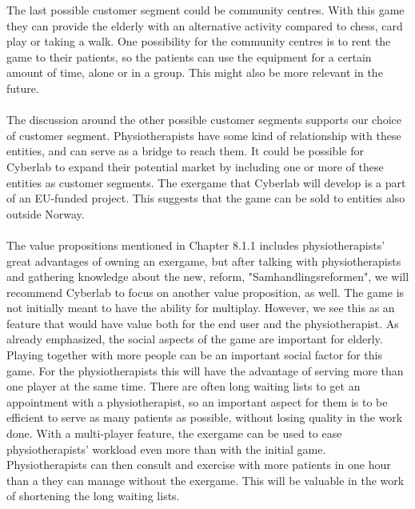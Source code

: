 The last possible customer segment could be community centres. With this game they can provide the elderly with an alternative activity compared to chess, card play or taking a walk. One possibility for the community centres is to rent the game to their patients, so the patients can use the equipment for a certain amount of time, alone or in a group. This might also be more relevant in the future. \\ \\
The discussion around the other possible customer segments supports our choice of customer segment. Physiotherapists have some kind of relationship with these entities, and can serve as a bridge to reach them. It could be possible for Cyberlab to expand their potential market by including one or more of these entities as customer segments. The exergame that Cyberlab will develop is a part of an EU-funded project. This suggests that the game can be sold to entities also outside Norway.  \\ \\
The value propositions mentioned in Chapter 8.1.1 includes physiotherapists' great advantages of owning an exergame, but after talking with physiotherapists and gathering knowledge about the new, reform, "Samhandlingsreformen", we will recommend Cyberlab to focus on another value proposition, as well. The game is not initially meant to have the ability for multiplay. However, we see this as an feature that would have value both for the end user and the physiotherapist. As already emphasized, the social aspects of the game are important for elderly. Playing together with more people can be an important social factor for this game. For the physiotherapists this will have the advantage of serving more than one player at the same time. There are often long waiting lists to get an appointment with a physiotherapist, so an important aspect for them is to be efficient to serve as many patients as possible, without losing quality in the work done. With a multi-player feature, the exergame can be used to ease physiotherapists' workload even more than with the initial game. Physiotherapists can then consult and exercise with more patients in one hour than a they can manage without the exergame. This will be valuable in the work of shortening the long waiting lists. \\ \\
